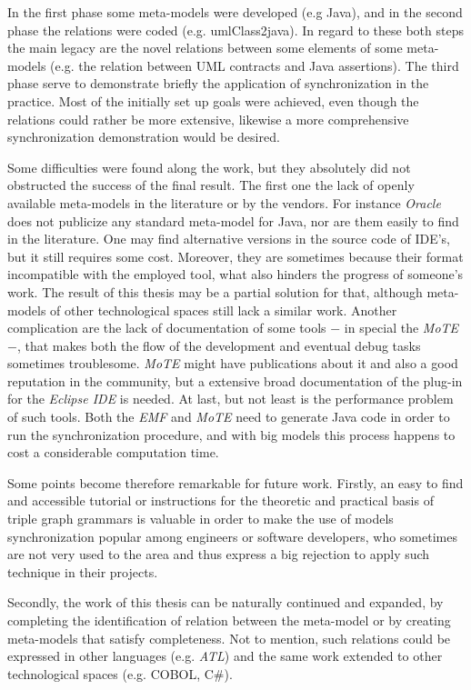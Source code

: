 \documentclass[tuberlin,cic,tc,english,noabntcite]{iiufrgs}
\begin{document}
In the first phase some meta-models were developed (e.g Java), and in the second phase the relations were coded (e.g. umlClass2java). In regard to these both steps the main legacy are the novel relations between some elements of some meta-models (e.g. the relation between UML contracts and Java assertions). The third phase serve to demonstrate briefly the application of synchronization in the practice. Most of the initially set up goals were achieved, even though the relations could rather be more extensive, likewise a more comprehensive synchronization demonstration would be desired.


Some difficulties were found along the work, but they absolutely did not obstructed the success of the final result. The first one the lack of openly available meta-models in the literature or by the vendors. For instance \emph{Oracle} does not publicize any standard meta-model for Java, nor are them easily to find in the literature. One may find alternative versions in the source code of IDE's, but it still requires some cost. Moreover, they are sometimes because their format incompatible with the employed tool, what also hinders the progress of someone's work. The result of this thesis may be a partial solution for that, although meta-models of other technological spaces still lack a similar work. Another complication are the lack of documentation of some tools $-$ in special the \emph{MoTE} $-$, that makes both the flow of the development and eventual debug tasks sometimes troublesome. \emph{MoTE} might have publications about it and also a good reputation in the community, but a extensive broad documentation of the plug-in for the \emph{Eclipse IDE} is needed. At last, but not least is the performance problem of such tools. Both the \emph{EMF} and \emph{MoTE} need to generate Java code in order to run the synchronization procedure, and with big models this process happens to cost a considerable computation time.

Some points become therefore remarkable for future work. Firstly, an easy to find and accessible tutorial or instructions for the theoretic and practical basis of triple graph grammars is valuable in order to make the use of models synchronization popular among engineers or software developers, who sometimes are not very used to the area and thus express a big rejection to apply such technique in their projects.

Secondly, the work of this thesis can be naturally continued and expanded, by completing the identification of relation between the meta-model or by creating meta-models that satisfy completeness. Not to mention, such relations could be expressed in other languages (e.g. \emph{ATL}) and the same work extended to other technological spaces (e.g. COBOL, C\#).
\end{document}
